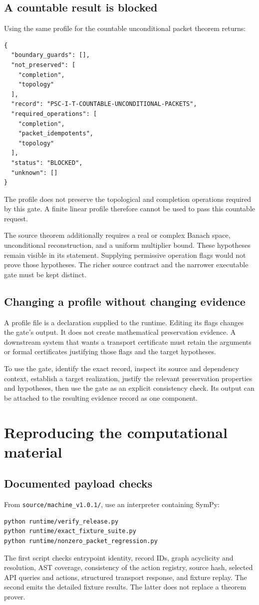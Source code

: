\documentclass[a4paper,11pt]{article}
\begin{document}
\subsection{A countable result is blocked}
Using the same profile for the countable unconditional packet theorem returns:

\begin{lstlisting}
{
  "boundary_guards": [],
  "not_preserved": [
    "completion",
    "topology"
  ],
  "record": "PSC-I-T-COUNTABLE-UNCONDITIONAL-PACKETS",
  "required_operations": [
    "completion",
    "packet_idempotents",
    "topology"
  ],
  "status": "BLOCKED",
  "unknown": []
}
\end{lstlisting}

The profile does not preserve the topological and completion operations required by this gate. A finite linear profile therefore cannot be used to pass this countable request.

The source theorem additionally requires a real or complex Banach space, unconditional reconstruction, and a uniform multiplier bound. These hypotheses remain visible in its statement. Supplying permissive operation flags would not prove those hypotheses. The richer source contract and the narrower executable gate must be kept distinct.
\subsection{Changing a profile without changing evidence}
A profile file is a declaration supplied to the runtime. Editing its flags changes the gate's output. It does not create mathematical preservation evidence. A downstream system that wants a transport certificate must retain the arguments or formal certificates justifying those flags and the target hypotheses.

To use the gate, identify the exact record, inspect its source and dependency context, establish a target realization, justify the relevant preservation properties and hypotheses, then use the gate as an explicit consistency check. Its output can be attached to the resulting evidence record as one component.

\section{Reproducing the computational material}
\subsection{Documented payload checks}
From \nolinkurl{source/machine_v1.0.1/}, use an interpreter containing SymPy:
\begin{lstlisting}
python runtime/verify_release.py
python runtime/exact_fixture_suite.py
python runtime/nonzero_packet_regression.py
\end{lstlisting}
The first script checks entrypoint identity, record IDs, graph acyclicity and resolution, AST coverage, consistency of the action registry, source hash, selected API queries and actions, structured transport response, and fixture replay. The second emits the detailed fixture results. The latter does not replace a theorem prover.
\end{document}
